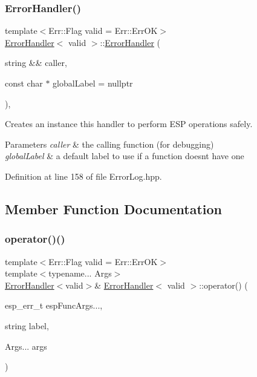 \subsubsection{\texorpdfstring{ErrorHandler()}{ErrorHandler()}}
{\footnotesize\ttfamily template$<$Err\+::\+Flag valid = Err\+::\+Err\+OK$>$ \\
\mbox{\hyperlink{classErrorHandler}{Error\+Handler}}$<$ valid $>$\+::\mbox{\hyperlink{classErrorHandler}{Error\+Handler}} (\begin{DoxyParamCaption}\item[{string \&\&}]{caller,  }\item[{const char $\ast$}]{global\+Label = {\ttfamily nullptr} }\end{DoxyParamCaption})\hspace{0.3cm}{\ttfamily [inline]}, {\ttfamily [explicit]}}

Creates an instance this handler to perform E\+SP operations safely.


\begin{DoxyParams}{Parameters}
{\em caller} & the calling function (for debugging) \\
\hline
{\em global\+Label} & a default label to use if a function doesn\textquotesingle{}t have one \\
\hline
\end{DoxyParams}


Definition at line 158 of file Error\+Log.\+hpp.


\begin{DoxyCode}{0}

\end{DoxyCode}


\subsection{Member Function Documentation}
\mbox{\label{classErrorHandler_a0be34c542953af71ff23efa474ddd2bb}} 
\subsubsection{\texorpdfstring{operator()()}{operator()()}}
{\footnotesize\ttfamily template$<$Err\+::\+Flag valid = Err\+::\+Err\+OK$>$ \\
template$<$typename... Args$>$ \\
\mbox{\hyperlink{classErrorHandler}{Error\+Handler}}$<$valid$>$\& \mbox{\hyperlink{classErrorHandler}{Error\+Handler}}$<$ valid $>$\+::operator() (\begin{DoxyParamCaption}\item[{esp\+\_\+err\+\_\+t }]{esp\+FuncArgs...,  }\item[{string}]{label,  }\item[{Args...}]{args }\end{DoxyParamCaption})\hspace{0.3cm}{\ttfamily [inline]}}

